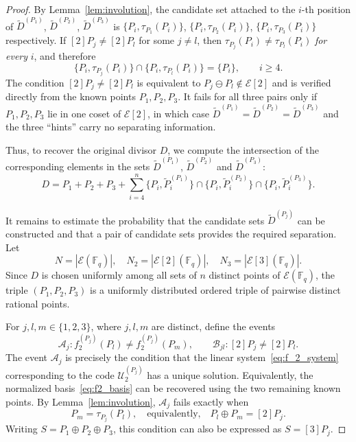 \documentclass[sn-mathphys-num]{sn-jnl_modified}
\newcommand{\FF}{\ensuremath{\mathbb{F}}}
\begin{document}
\begin{proof}
By Lemma~\ref{lem:involution}, the candidate set attached to the $i$-th position of $\widetilde{D}^{(P_1)}$, $\widetilde{D}^{(P_2)}$, $\widetilde{D}^{(P_3)}$ is $\{P_i, \tau_{P_1}(P_i)\}$, $\{P_i, \tau_{P_2}(P_i)\}$, $\{P_i, \tau_{P_3}(P_i)\}$ respectively. If $[2]P_j \neq [2]P_l$ for some $j \neq l$, then $\tau_{P_j}(P_i) \neq \tau_{P_l}(P_i)$
\emph{for every} $i$, and therefore
\[
\{P_i, \tau_{P_j}(P_i)\} \cap \{P_i, \tau_{P_l}(P_i)\} = \{P_i\}, \qquad i \geq 4.
\]
The condition $[2]P_j \neq [2]P_l$ is equivalent to $P_j \ominus P_l \notin \mathcal{E}[2]$ and is verified directly from the known points $P_1, P_2, P_3$. It fails for all three pairs only if $P_1, P_2, P_3$ lie in one coset of $\mathcal{E}[2]$, in which case $\widetilde{D}^{(P_1)} = \widetilde{D}^{(P_2)} = \widetilde{D}^{(P_3)}$ and the three ``hints'' carry no separating information.



Thus, to recover the original divisor $D$, we compute the intersection of the corresponding elements in the sets $\widetilde{D}^{(P_1)}$, $\widetilde{D}^{(P_2)}$ and $\widetilde{D}^{(P_3)}$:
\[
D = P_1 + P_2 + P_3 + \sum_{i = 4}^{n}\{P_i, \widetilde{P}_i^{(P_1)}\} \cap \{P_i, \widetilde{P}_i^{(P_2)}\}\cap \{P_i, \widetilde{P}_i^{(P_3)}\}.
\]



It remains to estimate the probability that the candidate sets $\widetilde{D}^{(P_j)}$ can be constructed and that a pair of candidate sets provides the required separation. Let
\[
N=|\mathcal{E}(\FF_q)|,\quad
N_2=|\mathcal{E}[2](\FF_q)|,\quad
N_3=|\mathcal{E}[3](\FF_q)|.
\]
Since $D$ is chosen uniformly among all sets of $n$ distinct points of $\mathcal{E}(\FF_q)$, the triple $(P_1,P_2,P_3)$ is a uniformly distributed ordered triple of pairwise distinct rational points.

For $j,l,m \in \{1,2,3\}$, where $j,l,m$ are distinct, define the events
\[
\mathcal{A}_j:
f_2^{(P_j)}(P_l)\neq f_2^{(P_j)}(P_m),
\qquad
\mathcal{B}_{jl}:
[2]P_j\neq[2]P_l.
\]
The event $\mathcal{A}_j$ is precisely the condition that the linear system~\eqref{eq:f_2_system} corresponding to the code $\mathcal{U}_2^{(P_j)}$ has a unique solution. Equivalently, the normalized basis~\eqref{eq:f2_basis} can be recovered using the two remaining known points. By Lemma~\ref{lem:involution}, $\mathcal{A}_j$ fails exactly when
\[
P_m=\tau_{P_j}(P_l), \quad \text{equivalently,} \quad P_l\oplus P_m=[2]P_j.
\]
Writing $S=P_1\oplus P_2\oplus P_3$, this condition can also be expressed as $S=[3]P_j$.



\end{proof}
\end{document}
